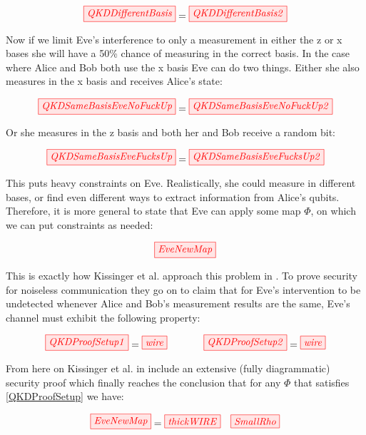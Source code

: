 \documentclass[]{article}
\begin{document}
\begin{equation}
\tikzfig{QKDDifferentBasis} = \tikzfig{QKDDifferentBasis2}
\end{equation}

Now if we limit Eve's interference to only a measurement in either the z or x bases she will have a 50\% chance of measuring in the correct basis. In the case where Alice and Bob both use the x basis Eve can do two things. Either she also measures in the x basis and receives Alice's state:

\begin{equation}
	\tikzfig{QKDSameBasisEveNoFuckUp} = \tikzfig{QKDSameBasisEveNoFuckUp2} 
\end{equation}

Or she measures in the z basis and both her and Bob receive a random bit:

\begin{equation}
	\tikzfig{QKDSameBasisEveFucksUp} = \tikzfig{QKDSameBasisEveFucksUp2}
\end{equation}

This puts heavy constraints on Eve. Realistically, she could measure in different bases, or find even different ways to extract information from Alice's qubits. Therefore, it is more general to state that Eve can apply some map $\Phi$, on which we can put constraints as needed:

\begin{equation}
	\tikzfig{EveNewMap}
\end{equation}

This is exactly how Kissinger et al. approach this problem in \cite{Kissinger2017}. To prove security for noiseless communication they go on to claim that for Eve's intervention to be undetected whenever Alice and Bob's measurement results are the same, Eve's channel must exhibit the following property:

\begin{equation}
	\label{QKDProofSetup}
	\tikzfig{QKDProofSetup1} = \tikzfig{wire} ~~~~~~~~~~~ \tikzfig{QKDProofSetup2} = \tikzfig{wire}
\end{equation}

From here on Kissinger et al. in \cite{Kissinger2017} include an extensive (fully diagrammatic) security proof which finally reaches the conclusion that for any $\Phi$ that satisfies \ref{QKDProofSetup} we have:

\begin{equation}
\tikzfig{EveNewMap} = \tikzfig{thickWIRE} ~~~ \tikzfig{SmallRho}
\end{equation}
\end{document}
